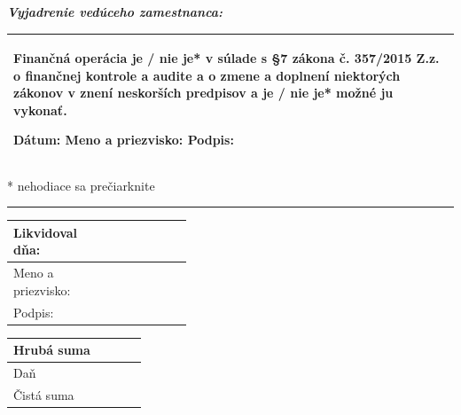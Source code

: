\documentclass[10pt,a4paper]{article}
\begin{document}
\vspace*{-0.5em}
\textbf{\textit{Vyjadrenie vedúceho zamestnanca:}}
\vspace*{-0.5em}

\bgroup
\def\arraystretch{2}
\begin{table}[h!]
\centering
\begin{tabularx}{\linewidth}{|X|}
	\hline
	Finančná operácia \textbf{je / nie je}* v súlade s §7 zákona č. 357/2015 Z.z. o finančnej kontrole a audite a o zmene a doplnení niektorých zákonov v znení neskorších predpisov a \textbf{je / nie je}* možné ju vykonať.	
	
	\vspace*{1em}
	
	Dátum: \hspace{2cm} Meno a priezvisko: \hspace{6.16cm} Podpis: \vspace*{1em}\\ \hline
\end{tabularx}
\end{table}
\egroup

* nehodiace sa prečiarknite

\vspace*{-0.5em}
\rule{\linewidth}{0.4pt}

\bgroup
\def\arraystretch{2}
\begin{table}[h!]
\begin{tabular}{|l|p{0.4\linewidth}|}
	\hline
	Likvidoval dňa: & \\ \hline
	Meno a priezvisko: & \\ \hline
	Podpis: & \\ \hline
\end{tabular} \hspace{0.066\linewidth}
\begin{tabular}{|p{0.3\linewidth}|}
	\hline
	Hrubá suma \\ \hline
	Daň \\ \hline
	Čistá suma \\ \hline
\end{tabular} \quad
\end{table}
\egroup
\end{document}
